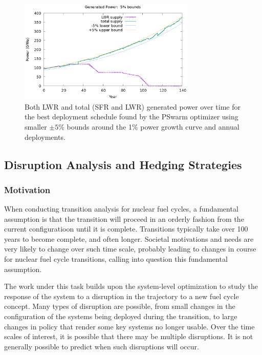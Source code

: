 \begin{figure}
    \centering
    \includegraphics[width=0.75\textwidth]{best-known-power.eps}
    \caption[Power for best build schedule with $\pm5\%$ bounds]{ Both
      \gls{LWR} and total (\gls{SFR} and \gls{LWR}) generated power over time
      for the best deployment schedule found by the PSwarm optimizer using
      smaller $\pm5\%$ bounds around the 1\% power growth curve and annual
      deployments.  }

    \label{fig:exp1-bestknownpower}
\end{figure}

\subsection{Disruption Analysis and Hedging Strategies}
\subsubsection{Motivation}

When conducting transition analysis for nuclear fuel cycles, a fundamental
assumption is that the transition will proceed in an orderly fashion from the
current configuratioon until it is complete.  Transitions typically take over
100 years to become complete, and often longer.  Societal motivations and
needs are very likely to change over such time scale, probably leading to
changes in course for nuclear fuel cycle transitions, calling into question
this fundamental assumption.

The work under this task builds upon the system-level optimization to study
the response of the system to a disruption in the trajectory to a new fuel
cycle concept.  Many types of disruption are possible, from small changes in
the configuration of the systems being deployed during the transition, to
large changes in policy that render some key systems no longer usable.  Over
the time scales of interest, it is possible that there may be multiple
disruptions.  It is not generally possible to predict when such disruptions
will occur.


